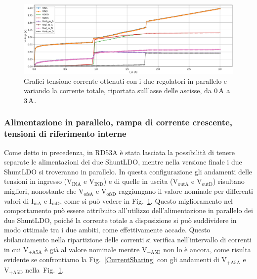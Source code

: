 % 
%

\begin{figure}[h]
\centering
\includegraphics[width=\textwidth]{Immagini/PUI}
\caption{Grafici tensione-corrente ottenuti con i due regolatori in parallelo e variando la corrente totale, riportata sull'asse delle ascisse, da $0\rm \, A$ a $3\rm \, A$.}
\label{PUI}
\end{figure}
\subsubsection{Alimentazione in parallelo, rampa di corrente crescente, tensioni di riferimento interne} 

Come detto in precedenza, in RD53A è stata lasciata la possibilità di tenere separate le alimentazioni dei due ShuntLDO, mentre nella versione finale i due ShuntLDO si troveranno in parallelo. 
In questa configurazione gli andamenti delle tensioni in ingresso ($\mathrm{V_{INA}}$ e $\mathrm{V_{IND}}$) e di quelle in uscita ($\mathrm{V_{outA}}$ e $\mathrm{V_{outD}}$) risultano migliori, nonostante che $\mathrm{V_{ofsA}}$ e $\mathrm{V_{ofsD}}$ raggiungano il valore nominale per differenti valori di $\mathrm{I_{inA}}$ e $\mathrm{I_{inD}}$, come si può vedere in Fig.~\ref{PUI}.
Questo miglioramento nel comportamento può essere attribuito all'utilizzo dell'alimentazione in parallelo dei due ShuntLDO, poiché la corrente totale a disposizione si può suddividere in modo ottimale tra i due ambiti, come effettivamente accade. Questo sbilanciamento nella ripartizione delle correnti si verifica nell'intervallo di correnti in cui $\mathrm{V_{+A5A}}$ \`e gi\`a al valore nominale mentre $\mathrm{V_{+A5D}}$ non lo \`e ancora, come risulta evidente se confrontiamo la Fig.~\ref{CurrentSharing} con gli andamenti di $\mathrm{V_{+A5A}}$ e $\mathrm{V_{+A5D}}$ nella~Fig.~\ref{PUI}.

